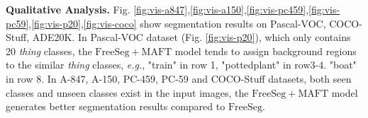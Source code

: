 \noindent \textbf{Qualitative Analysis.} Fig. \ref{fig:vis-a847},\ref{fig:vis-a150},\ref{fig:vis-pc459},\ref{fig:vis-pc59},\ref{fig:vis-p20},\ref{fig:vis-coco} show segmentation results on Pascal-VOC, COCO-Stuff, ADE20K. In Pascal-VOC dataset (Fig. \ref{fig:vis-p20}), which only contains 20 \textit{thing} classes, the $\mathrm{FreeSeg+MAFT}$ model tends to assign background regions to the similar \textit{thing} classes, \textit{e.g.},  "train" in row 1, "pottedplant" in row3-4. "boat" in row 8. In A-847, A-150, PC-459, PC-59 and COCO-Stuff datasets, both seen classes and unseen classes exist in the input images, the $\mathrm{FreeSeg+MAFT}$ model generates better segmentation results compared to $\mathrm{FreeSeg}$.

